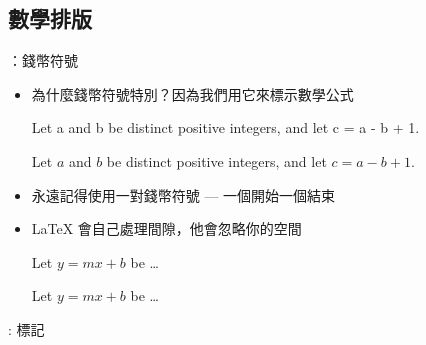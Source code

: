 \documentclass{beamer}
\begin{document}
\subsection{數學排版}
\begin{frame}[fragile]{\insertsubsection{}：錢幣符號}
\begin{itemize}
\item 為什麼錢幣符號\keystrokebftt{\$}特別？因為我們用它來標示數學公式\\[1ex]
\begin{exampletwouptiny}
Let a and b be distinct positive
integers, and let c = a - b + 1.

Let $a$ and $b$ be distinct positive
integers, and let $c = a - b + 1$.
\end{exampletwouptiny}
\item 永遠記得使用一對錢幣符號 --- 一個開始一個結束
\item \LaTeX{} 會自己處理間隙，他會忽略你的空間
\begin{exampletwouptiny}
Let $y=mx+b$ be \ldots

Let $y = m x + b$ be \ldots
\end{exampletwouptiny}
\end{itemize}
\end{frame}

\begin{frame}[fragile]{\insertsubsection{}: 標記}
\end{frame}
\end{document}
